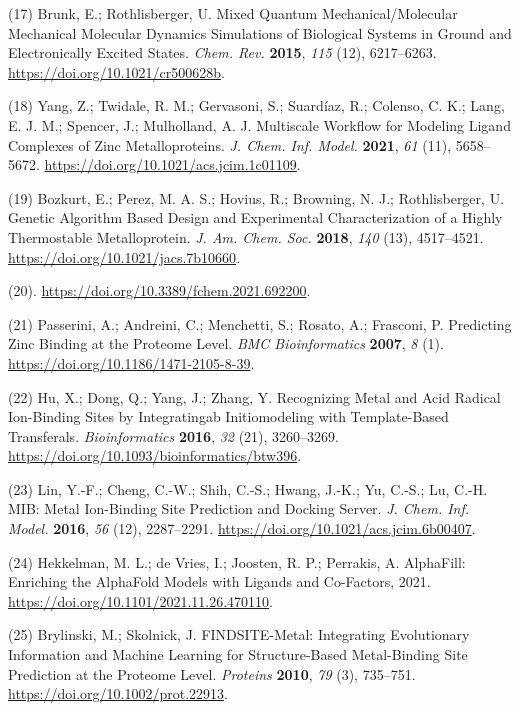 \documentclass[ lineno,
  9pt]{elife}
\newenvironment{cslreferences}%
  {}%
  {\par}
\begin{document}
\begin{cslreferences}
\leavevmode\hypertarget{ref-5Vxh8hay}{}%
(17) Brunk, E.; Rothlisberger, U. Mixed Quantum Mechanical/Molecular Mechanical Molecular Dynamics Simulations of Biological Systems in Ground and Electronically Excited States. \emph{Chem. Rev.} \textbf{2015}, \emph{115} (12), 6217--6263. \url{https://doi.org/10.1021/cr500628b}.

\leavevmode\hypertarget{ref-IXq7vmo3}{}%
(18) Yang, Z.; Twidale, R. M.; Gervasoni, S.; Suardíaz, R.; Colenso, C. K.; Lang, E. J. M.; Spencer, J.; Mulholland, A. J. Multiscale Workflow for Modeling Ligand Complexes of Zinc Metalloproteins. \emph{J. Chem. Inf. Model.} \textbf{2021}, \emph{61} (11), 5658--5672. \url{https://doi.org/10.1021/acs.jcim.1c01109}.

\leavevmode\hypertarget{ref-nlfa683y}{}%
(19) Bozkurt, E.; Perez, M. A. S.; Hovius, R.; Browning, N. J.; Rothlisberger, U. Genetic Algorithm Based Design and Experimental Characterization of a Highly Thermostable Metalloprotein. \emph{J. Am. Chem. Soc.} \textbf{2018}, \emph{140} (13), 4517--4521. \url{https://doi.org/10.1021/jacs.7b10660}.

\leavevmode\hypertarget{ref-b5EJeHX3}{}%
(20). \url{https://doi.org/10.3389/fchem.2021.692200}.

\leavevmode\hypertarget{ref-qNdK0F1w}{}%
(21) Passerini, A.; Andreini, C.; Menchetti, S.; Rosato, A.; Frasconi, P. Predicting Zinc Binding at the Proteome Level. \emph{BMC Bioinformatics} \textbf{2007}, \emph{8} (1). \url{https://doi.org/10.1186/1471-2105-8-39}.

\leavevmode\hypertarget{ref-KNmKWbrP}{}%
(22) Hu, X.; Dong, Q.; Yang, J.; Zhang, Y. Recognizing Metal and Acid Radical Ion-Binding Sites by Integratingab Initiomodeling with Template-Based Transferals. \emph{Bioinformatics} \textbf{2016}, \emph{32} (21), 3260--3269. \url{https://doi.org/10.1093/bioinformatics/btw396}.

\leavevmode\hypertarget{ref-1HMhB3vxM}{}%
(23) Lin, Y.-F.; Cheng, C.-W.; Shih, C.-S.; Hwang, J.-K.; Yu, C.-S.; Lu, C.-H. MIB: Metal Ion-Binding Site Prediction and Docking Server. \emph{J. Chem. Inf. Model.} \textbf{2016}, \emph{56} (12), 2287--2291. \url{https://doi.org/10.1021/acs.jcim.6b00407}.

\leavevmode\hypertarget{ref-13fLqNwbD}{}%
(24) Hekkelman, M. L.; de Vries, I.; Joosten, R. P.; Perrakis, A. AlphaFill: Enriching the AlphaFold Models with Ligands and Co-Factors, 2021. \url{https://doi.org/10.1101/2021.11.26.470110}.

\leavevmode\hypertarget{ref-W4f7UG1p}{}%
(25) Brylinski, M.; Skolnick, J. FINDSITE-Metal: Integrating Evolutionary Information and Machine Learning for Structure-Based Metal-Binding Site Prediction at the Proteome Level. \emph{Proteins} \textbf{2010}, \emph{79} (3), 735--751. \url{https://doi.org/10.1002/prot.22913}.


\end{cslreferences}
\end{document}

